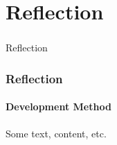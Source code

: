 \section[Reflection]{Reflection}

\begin{frame}
  \frametitle{}
  \begin{center}
    {\Huge Reflection}
  \end{center}
\end{frame}

\begin{frame}
    \frametitle{Reflection}
    \framesubtitle{Development Method}
    \centering
    Some text, content, etc.
\end{frame}
